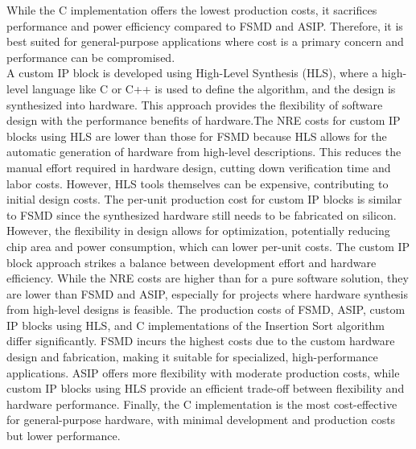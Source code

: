 \documentclass[conference]{IEEEtran}
\begin{document}
While the C implementation offers the lowest production costs, it sacrifices performance and power efficiency compared to FSMD and ASIP. Therefore, it is best suited for general-purpose applications where cost is a primary concern and performance can be compromised.\\
A custom IP block is developed using High-Level Synthesis (HLS), where a high-level language like C or C++ is used to define the algorithm, and the design is synthesized into hardware. This approach provides the flexibility of software design with the performance benefits of hardware.The NRE costs for custom IP blocks using HLS are lower than those for FSMD because HLS allows for the automatic generation of hardware from high-level descriptions. This reduces the manual effort required in hardware design, cutting down verification time and labor costs. However, HLS tools themselves can be expensive, contributing to initial design costs. The per-unit production cost for custom IP blocks is similar to FSMD since the synthesized hardware still needs to be fabricated on silicon. However, the flexibility in design allows for optimization, potentially reducing chip area and power consumption, which can lower per-unit costs. The custom IP block approach strikes a balance between development effort and hardware efficiency. While the NRE costs are higher than for a pure software solution, they are lower than FSMD and ASIP, especially for projects where hardware synthesis from high-level designs is feasible.
The production costs of FSMD, ASIP, custom IP blocks using HLS, and C implementations of the Insertion Sort algorithm differ significantly. FSMD incurs the highest costs due to the custom hardware design and fabrication, making it suitable for specialized, high-performance applications. ASIP offers more flexibility with moderate production costs, while custom IP blocks using HLS provide an efficient trade-off between flexibility and hardware performance. Finally, the C implementation is the most cost-effective for general-purpose hardware, with minimal development and production costs but lower performance. 
\end{document}
